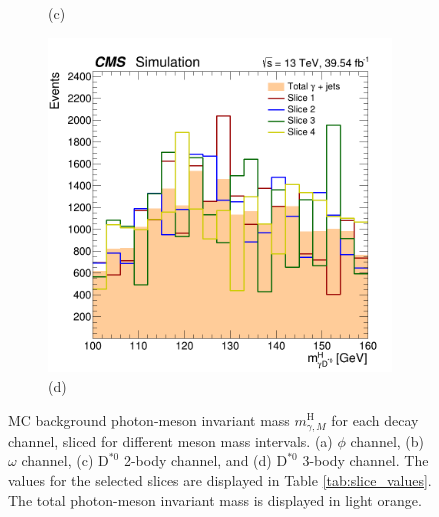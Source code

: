 \begin{figure}[!ht]
\begin{subfigure}[t]{0.50\mylength}
        \vspace*{-0.2cm}
        \caption{\footnotesize (c)}
    \end{subfigure}%
    \begin{subfigure}[t]{0.50\mylength}
        \centering
        \includegraphics[width=0.49\mylength]{resources/plots/D0Star_3body_fit_BKG_MH_sliced.png}
        \vspace*{-0.2cm}
        \caption{\footnotesize (d)}
    \end{subfigure}%
\caption{MC background photon-meson invariant mass $m^{\text{H}}_{\gamma, M}$ for each decay channel, sliced for different meson mass intervals. (a) $\phi$ channel, (b) $\omega$ channel, (c) $\text{D}^{*0}$ 2-body channel, and (d) $\text{D}^{*0}$ 3-body channel. The values for the selected slices are displayed in Table \ref{tab:slice_values}. The total photon-meson invariant mass is displayed in light orange.}
\label{fig:bkg_modelling_sliced}
    \vspace*{-0.0cm}
\end{figure}


